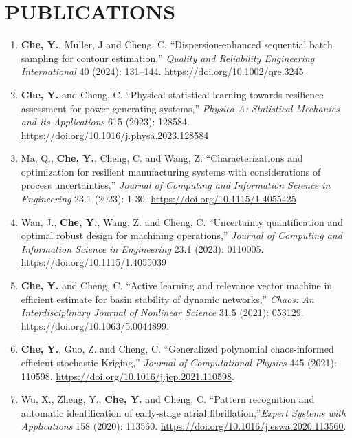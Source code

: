 \documentclass[10pt]{article}
\begin{document}
\section*{PUBLICATIONS}
\begin{enumerate}
	\item {\bf Che, Y.}, Muller, J and Cheng, C. ``Dispersion-enhanced sequential batch sampling for contour estimation,'' \textit{Quality and Reliability Engineering International} 40 (2024): 131–144. \url{https://doi.org/10.1002/qre.3245} 

	\item {\bf Che, Y.} and Cheng, C. ``Physical-statistical learning towards resilience assessment for power generating systems,'' \textit{Physica A: Statistical Mechanics and its Applications} 615 (2023): 128584. \url{https://doi.org/10.1016/j.physa.2023.128584}

	\item Ma, Q., {\bf Che, Y.}, Cheng, C. and Wang, Z. ``Characterizations and optimization for resilient manufacturing systems with considerations of process uncertainties,'' \textit{Journal of Computing and Information Science in Engineering} 23.1 (2023): 1-30. \url{ https://doi.org/10.1115/1.4055425}

	\item Wan, J., {\bf Che, Y.}, Wang, Z. and Cheng, C. ``Uncertainty quantification and optimal robust design for machining operations,'' \textit{Journal of Computing and Information Science in Engineering} 23.1 (2023): 0110005. \url{https://doi.org/10.1115/1.4055039}

	\item {\bf Che, Y.} and Cheng, C. ``Active learning and relevance vector machine in efficient estimate for basin stability of dynamic networks,'' \textit{Chaos: An Interdisciplinary Journal of Nonlinear Science} 31.5 (2021): 053129. \url{https://doi.org/10.1063/5.0044899}.

	\item {\bf Che, Y.}, Guo, Z. and Cheng, C. ``Generalized polynomial chaos-informed efficient stochastic Kriging,'' \textit{Journal of Computational Physics} 445 (2021): 110598. \url{https://doi.org/10.1016/j.jcp.2021.110598}.

	\item Wu, X., Zheng, Y., {\bf Che, Y.} and Cheng, C. ``Pattern recognition and automatic identification of early-stage atrial fibrillation,''\textit{Expert Systems with Applications} 158 (2020): 113560. \url{https://doi.org/10.1016/j.eswa.2020.113560}.


\end{enumerate}
\end{document}
